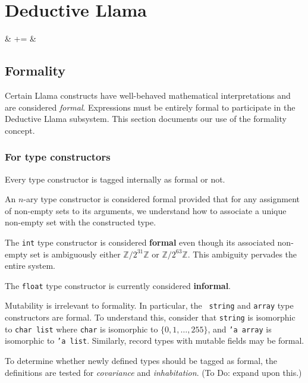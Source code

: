 \documentclass[11pt]{article}
\def\isalso{ & += & \spacefalse }
\begin{document}
\section{Deductive Llama}

\begin{syntax}
\isalso{}  \token{,} 
\end{syntax} \begin{syntax}
\is{}
 \alt{}
 \alt{}
\end{syntax}

\subsection{Formality}

Certain Llama constructs have well-behaved mathematical
interpretations and are considered {\it formal}. Expressions must be
entirely formal to participate in the Deductive Llama subsystem. This
section documents our use of the formality concept.

\subsubsection{For type constructors}

Every type constructor is tagged internally as formal or not.

An $n$-ary type constructor is considered formal provided that for any
assignment of non-empty sets to its arguments, we understand how to
associate a unique non-empty set with the constructed type.

The {\tt int} type constructor is considered {\bf formal} even though its
associated non-empty set is ambiguously either $\mathbb{Z} / 2^{31}
\mathbb{Z}$ or $\mathbb{Z} / 2^{63} \mathbb{Z}$.  This ambiguity
pervades the entire system.

The {\tt float} type constructor is currently considered {\bf informal}.

Mutability is irrelevant to formality.  In particular, the {\tt
  string} and {\tt array} type constructors are formal. To understand this,
consider that {\tt string} is isomorphic to {\tt char list} where
{\tt char} is isomorphic to $\{ 0, 1, \ldots, 255 \}$, and {\tt 'a
  array} is isomorphic to {\tt 'a list}.  Similarly, record types with
mutable fields may be formal.

To determine whether newly defined types should be tagged as formal,
the definitions are tested for {\it covariance} and {\it inhabitation}.
(To Do: expand upon this.)
\end{document}
